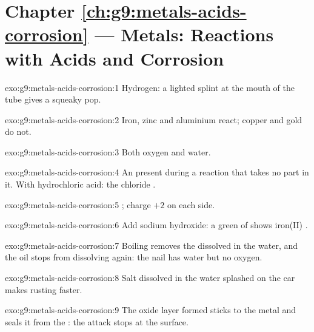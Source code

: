 \section*{Chapter \ref{ch:g9:metals-acids-corrosion} --- Metals: Reactions with Acids and Corrosion}

\begin{solution}{exo:g9:metals-acids-corrosion:1}
Hydrogen: a lighted splint at the mouth of the tube gives a squeaky pop.
\end{solution}

\begin{solution}{exo:g9:metals-acids-corrosion:2}
Iron, zinc and aluminium react; copper and gold do not.
\end{solution}

\begin{solution}{exo:g9:metals-acids-corrosion:3}
Both oxygen and water.
\end{solution}

\begin{solution}{exo:g9:metals-acids-corrosion:4}
An  present during a reaction that takes no part in it. With
hydrochloric acid: the chloride  .
\end{solution}

\begin{solution}{exo:g9:metals-acids-corrosion:5}
; charge $+2$ on each side.
\end{solution}

\begin{solution}{exo:g9:metals-acids-corrosion:6}
Add sodium hydroxide: a green  of  shows
iron(II) .
\end{solution}

\begin{solution}{exo:g9:metals-acids-corrosion:7}
Boiling removes the  dissolved in the water, and the oil stops 
from dissolving again: the nail has water but no oxygen.
\end{solution}

\begin{solution}{exo:g9:metals-acids-corrosion:8}
Salt dissolved in the water splashed on the car makes rusting faster.
\end{solution}

\begin{solution}{exo:g9:metals-acids-corrosion:9}
The oxide layer formed sticks to the metal and seals it from the : the
attack stops at the surface.
\end{solution}

